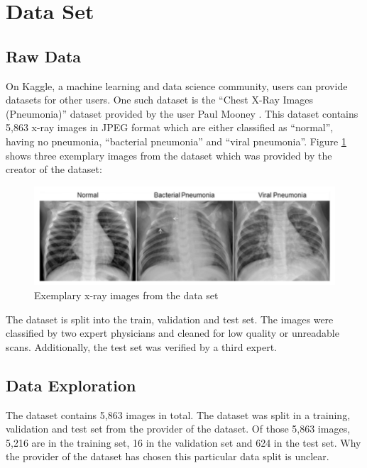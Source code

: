 \section{Data Set}
\subsection{Raw Data}
On Kaggle, a machine learning and data science community, users can provide datasets for other users. One such dataset is the “Chest X-Ray Images (Pneumonia)” dataset provided by the user Paul Mooney \cite{mooney2018}.  This dataset contains 5,863 x-ray images in JPEG format which are either classified as “normal”, having no pneumonia, “bacterial pneumonia” and “viral pneumonia”. Figure \ref{fig:kagglePneumonia} shows three exemplary images from the dataset which was provided by the creator of the dataset: 

\begin{figure}[h]
  \centering
  \includegraphics[width=\linewidth]{figures/Kaggle_x_ray_example.png}
  \caption{Exemplary x-ray images from the data set} 
  \label{fig:kagglePneumonia}
\end{figure}

The dataset is split into the train, validation and test set. The images were classified by two expert physicians and cleaned for low quality or unreadable scans. Additionally, the test set was verified by a third expert.
\subsection{Data Exploration}
The dataset contains 5,863 images in total. The dataset was split in a training, validation and test set from the provider of the dataset. Of those 5,863 images, 5,216 are in the training set, 16 in the validation set and 624 in the test set. Why the provider of the dataset has chosen this particular data split is unclear. 

